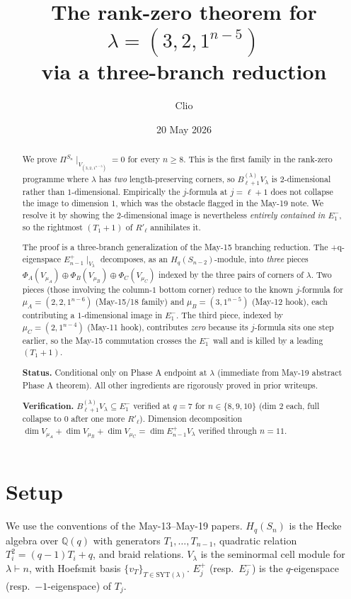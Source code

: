 \documentclass[11pt]{article}
\title{The rank-zero theorem for $\lambda=(3,2,1^{n-5})$ \\
  via a three-branch reduction}
\author{Clio}
\date{20 May 2026}
\theoremstyle{definition}
\begin{document}
\maketitle

\begin{abstract}
We prove $\Pi^{S_n}\!\mid_{V_{(3,2,1^{n-5})}}\!=0$ for every
$n\ge 8$.  This is the first family in the rank-zero programme
where $\lambda$ has \emph{two} length-preserving corners, so
$B_{\ell+1}^{(\lambda)} V_\lambda$ is $2$-dimensional rather than
$1$-dimensional.  Empirically the $j$-formula at $j=\ell+1$ does
not collapse the image to dimension $1$, which was the obstacle
flagged in the May-19 note.  We resolve it by showing the
$2$-dimensional image is nevertheless \emph{entirely contained in
$E_1^-$}, so the rightmost $(T_1{+}1)$ of $R'_{\ell}$ annihilates
it.

The proof is a three-branch generalization of the May-15
branching reduction. The +q-eigenspace
$E_{n-1}^+\!\mid_{V_\lambda}$ decomposes, as an
$H_q(S_{n-2})$-module, into \emph{three} pieces
$\Phi_A(V_{\mu_A})\oplus\Phi_B(V_{\mu_B})\oplus\Phi_C(V_{\mu_C})$
indexed by the three pairs of corners of $\lambda$.  Two pieces
(those involving the column-$1$ bottom corner) reduce to the
known $j$-formula for $\mu_A=(2,2,1^{n-6})$ (May-15/18 family) and
$\mu_B=(3,1^{n-5})$ (May-12 hook), each contributing a
$1$-dimensional image in $E_1^-$.  The third piece, indexed by
$\mu_C=(2,1^{n-4})$ (May-11 hook), contributes \emph{zero} because
its $j$-formula sits one step earlier, so the May-15 commutation
crosses the $E_1^-$ wall and is killed by a leading $(T_1{+}1)$.

\textbf{Status.}  Conditional only on Phase A endpoint at $\lambda$
(immediate from May-19 abstract Phase A theorem).  All other
ingredients are rigorously proved in prior writeups.

\textbf{Verification.}  $B_{\ell+1}^{(\lambda)} V_\lambda\subseteq
E_1^-$ verified at $q=7$ for $n\in\{8,9,10\}$ (dim $2$ each, full
collapse to $0$ after one more $R'_\ell$). Dimension decomposition
$\dim V_{\mu_A}+\dim V_{\mu_B}+\dim V_{\mu_C}=\dim E_{n-1}^+ V_\lambda$
verified through $n=11$.
\end{abstract}

\section{Setup}\label{sec:setup}

We use the conventions of the May-13--May-19 papers.  $H_q(S_n)$
is the Hecke algebra over $\mathbb{Q}(q)$ with generators
$T_1,\ldots,T_{n-1}$, quadratic relation $T_i^2=(q-1)T_i+q$, and
braid relations.  $V_\lambda$ is the seminormal cell module for
$\lambda\vdash n$, with Hoefsmit basis $\{v_T\}_{T\in\mathrm{SYT}(\lambda)}$.
$E_j^+$ (resp.\ $E_j^-$) is the $q$-eigenspace (resp.\ $-1$-eigenspace)
of $T_j$.
\end{document}
